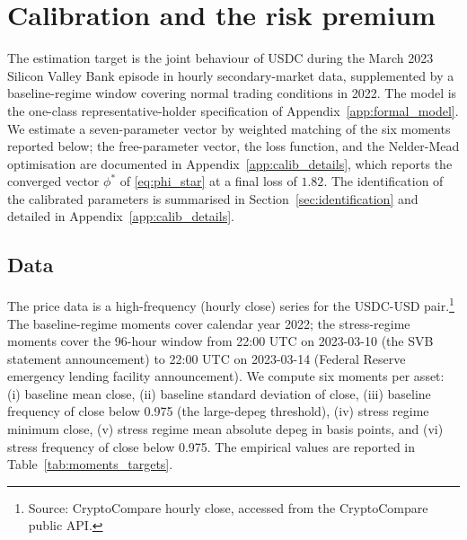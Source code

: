 \section{Calibration and the risk premium}\label{sec:calibration}

The estimation target is the joint behaviour of USDC during the March 2023 Silicon Valley Bank episode in hourly secondary-market data, supplemented by a baseline-regime window covering normal trading conditions in 2022. The model is the one-class representative-holder specification of Appendix~\ref{app:formal_model}. We estimate a seven-parameter vector by weighted matching of the six moments reported below; the free-parameter vector, the loss function, and the Nelder-Mead optimisation are documented in Appendix~\ref{app:calib_details}, which reports the converged vector $\phi^*$ of \eqref{eq:phi_star} at a final loss of $1.82$. The identification of the calibrated parameters is summarised in Section~\ref{sec:identification} and detailed in Appendix~\ref{app:calib_details}.

\subsection{Data}\label{sub:calibration_data}

The price data is a high-frequency (hourly close) series for the USDC-USD pair.\footnote{Source: CryptoCompare hourly close, accessed from the CryptoCompare public API.} The baseline-regime moments cover calendar year 2022; the stress-regime moments cover the 96-hour window from 22:00 UTC on 2023-03-10 (the SVB statement announcement) to 22:00 UTC on 2023-03-14 (Federal Reserve emergency lending facility announcement). We compute six moments per asset: (i) baseline mean close, (ii) baseline standard deviation of close, (iii) baseline frequency of close below 0.975 (the large-depeg threshold), (iv) stress regime minimum close, (v) stress regime mean absolute depeg in basis points, and (vi) stress frequency of close below 0.975. The empirical values are reported in Table~\ref{tab:moments_targets}.

